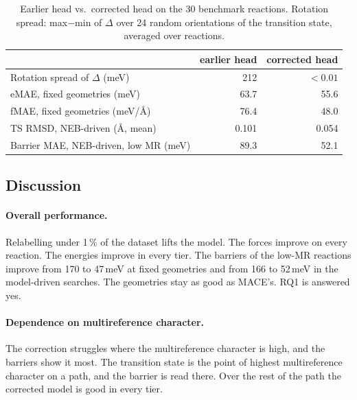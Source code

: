 \begin{table}[htbp]
  \centering
  \caption{Earlier head vs.\ corrected head on the 30 benchmark reactions.
  Rotation spread: max$-$min of $\Delta$ over 24 random orientations of the
  transition state, averaged over reactions.}
  \label{tab:delta-audit}
  \begin{tabular}{lrr}
    \toprule
    & earlier head & corrected head \\
    \midrule
    Rotation spread of $\Delta$ (meV) & 212 & $<0.01$ \\
    eMAE, fixed geometries (meV) & 63.7 & 55.6 \\
    fMAE, fixed geometries (meV/\AA) & 76.4 & 48.0 \\
    TS RMSD, NEB-driven (\AA, mean) & 0.101 & 0.054 \\
    Barrier MAE, NEB-driven, low MR (meV) & 89.3 & 52.1 \\
    \bottomrule
  \end{tabular}
\end{table}


\subsection{Discussion}
\label{sec:delta-discussion}

\paragraph{Overall performance.} Relabelling under 1\,\% of the dataset lifts
the model. The forces improve on every reaction. The energies improve
in every tier. The barriers of the low-MR reactions improve from 170
to 47\,meV at fixed geometries and from 166 to 52\,meV in the
model-driven searches. The geometries stay as good as MACE's. RQ1 is
answered yes.

\paragraph{Dependence on multireference character.} The correction struggles where the
multireference character is high, and the barriers show it most. The
transition state is the point of highest multireference character on
a path, and the barrier is read there. Over the rest of the path the
corrected model is good in every tier.

